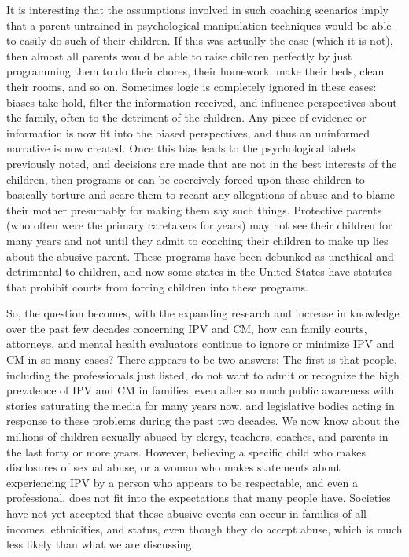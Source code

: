 It is interesting that the assumptions involved in such coaching scenarios imply that a parent untrained in psychological manipulation
techniques would be able to easily do such  of 
their children. If this was actually the case (which it is not), then almost all parents
would be able to raise children perfectly by just programming them to
do their chores, their homework, make their beds, clean their rooms,
and so on. Sometimes logic is completely ignored in these cases: biases
take hold, filter the information received, and influence perspectives
about the family, often to the detriment of the children. Any piece of
evidence or information is now fit into the biased perspectives, and thus
an uninformed narrative is now created. Once this bias 
leads to the psychological labels
previously noted, and decisions are made that are not in the best
interests of the children, then  programs or  
can be coercively forced upon these children 
to basically torture and scare them
to recant any allegations of abuse and to blame 
their mother presumably for making them say such things. Protective parents (who often
were the primary caretakers for years) may not see their children for
many years and not until they admit to coaching their children to make
up lies about the abusive parent. These programs have been debunked
as unethical and detrimental to children, and now some states in the
United States have statutes that prohibit courts from forcing children
into these programs. \pfl{}

\vspace*{0pt}\enlargethispage{3pt}\raggedbottom
So, the question becomes, with the expanding research and increase in knowledge over the past few decades concerning IPV and CM, how can
family courts, attorneys, and mental health evaluators continue to ignore or minimize IPV and CM in so many cases? There appears to
be two answers: The first is that people, including the professionals
just listed, do not want to admit or recognize the high prevalence of IPV and CM in families, even after so much public awareness
with stories saturating the media for many years now, and legislative bodies acting in response to these problems during the past two
decades. We now know about the millions of children sexually abused
by clergy, teachers, coaches, and parents in the last forty or more years.
However, believing a specific child who makes disclosures of sexual
abuse, or a woman who makes statements about experiencing IPV by
a person who appears to be respectable,  and even 
a professional, does not fit into the expectations that many people have.
Societies have not yet accepted that these abusive events can occur in
families of all incomes, ethnicities, and status, even though they do
accept  abuse, which is much less likely than what we are
discussing. \pfl{}

